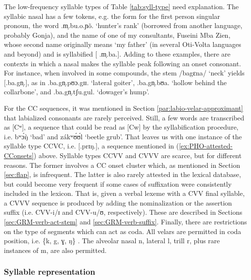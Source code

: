 The low-frequency  syllable types  of Table \ref{tab:syll-type} need 
explanation. The syllabic
nasal has a few tokens, e.g.  the form for the
first person singular pronoun,  the word {\sls .m̩.bu.o.ɲõ.} `hunter's rank'
(borrowed from another language,  probably Gonja), and  the name of one of
my 
consultants, Fuseini Mba Zien, whose second name  originally means  `my 
father'
 (in several Oti-Volta languages and beyond) and is syllabified [{\sls 
.m̩.ba.}].  Adding to
these examples,  there are contexts in which  a nasal makes the
syllable
peak
 following an  onset consonant. For instance, when involved in some compounds,
the
stem  /{\sls bagɛna}/  `neck'  yields  [{\sls .ba.gn̩.}], as in 
{\sls .ba.gn̩.pʊɔ.gɪɪ.} `lateral goiter',  {\sls .ba.gn̩.bʊa.} `hollow behind 
the
collarbone',   and {\sls .ba.gn̩.tʃu.gul.}  `dowager's hump'.  

For the CC sequences, it was mentioned in Section 
\ref{par:labio-velar-approximant} that labialized consonants are rarely 
perceived. Still, a few words are transcribed as   [{\sls Cʷ}], a sequence that 
could be read as  [{\sls Cw}] by the syllabification procedure, i.e.  {\sls 
bʷɔ́ŋ̀} `bad' and {\sls zákʷʊ́ʊ́l} `beetle grub'.  That leaves us with one  
instance of the syllable type CCVC, i.e. [{\sls .prɪŋ.}],  a sequence mentioned 
 in (\ref{ex:PHO-attested-CConsets}) above. Syllable types CCVV and CVVV are 
scarce, but for different reasons. The former involves a CC onset cluster which, 
as mentioned in Section \ref{sec:flap},  is infrequent. The latter is also 
rarely attested in the lexical database,  but could become very frequent if some 
cases of suffixation  were consistently included in the lexicon. That is, given 
a verbal lexeme with a CVV final syllable,  a CVVV sequence is produced by 
adding the nominalization or the assertion suffix  (i.e. CVV-{\sls i/ɪ}   and   
CVV-{\sls u/ʊ},  respectively).  These are described in Sections 
\ref{sec:GRM-verb-act-stem} and \ref{sec:GRM-verb-suffix}.  Finally, there are 
restrictions on the type of segments which can act as coda. All velars are 
permitted in coda position, i.e. \{{\sls k, g, ɣ, ŋ}\} . The alveolar nasal 
{\sls 
n},   lateral {\sls l},  trill {\sls r}, plus rare instances of {\sls m},  are 
also permitted. 



\subsubsection{Syllable representation}
\label{sec:syllable-types}

